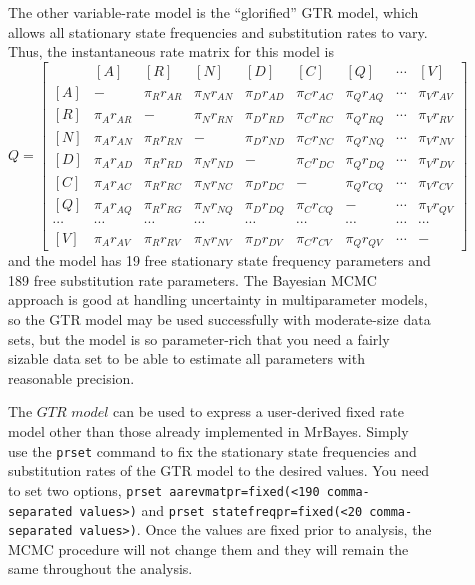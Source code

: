 \documentclass[12pt]{book}
\newcommand{\ttt}[1]{\texttt{#1}}
\begin{document}
\begin{figure}[h]
The other variable-rate model is the ``glorified'' GTR model, which allows all stationary state
frequencies and substitution rates to vary. Thus, the instantaneous rate matrix for this model is
\footnotesize
\[
Q=\begin{bmatrix}
    & [A] & [R] & [N] & [D] & [C] & [Q] & \cdots & [V]\\
 [A]& - & \pi_{R} r_{AR}& \pi_{N} r_{AN} & \pi_{D} r_{AD}& \pi_{C} r_{AC}& \pi_{Q} r_{AQ} & \cdots & \pi_V r_{AV}\\
 [R]& \pi_{A} r_{AR} &- &  \pi_{N}  r_{RN}& \pi_{D} r_{RD}& \pi_{C} r_{RC}& \pi_{Q} r_{RQ} & \cdots & \pi_V r_{RV}\\
 [N]& \pi_{A} r_{AN}&\pi_{R} r_{RN}&- &   \pi_{D} r_{ND}& \pi_{C} r_{NC}& \pi_{Q} r_{NQ} & \cdots & \pi_V r_{NV}\\
 [D]& \pi_{A} r_{AD} &\pi_{R} r_{RD} &  \pi_{N} r_{ND}&- &  \pi_{C} r_{DC}& \pi_{Q} r_{DQ} & \cdots & \pi_V r_{DV}\\
 [C]& \pi_{A} r_{AC} &\pi_{R} r_{RC} &  \pi_{N} r_{NC}&  \pi_{D} r_{DC}&- & \pi_{Q} r_{CQ} & \cdots & \pi_V r_{CV}\\
 [Q]& \pi_{A} r_{AQ} &\pi_{R} r_{RG} &  \pi_{N} r_{NQ}&  \pi_{D} r_{DQ}& \pi_{C} r_{CQ} &- & \cdots & \pi_V r_{QV}\\
 \cdots& \cdots& \cdots& \cdots& \cdots& \cdots& \cdots& \cdots& \cdots\\
 [V]& \pi_{A} r_{AV} &\pi_{R} r_{RV} &  \pi_{N} r_{NV}&  \pi_{D} r_{DV}& \pi_{C} r_{CV} &\pi_Q r_{QV}& \cdots & -
\end{bmatrix}
\]
\normalsize
and the model has 19 free stationary state frequency parameters and 189 free substitution rate
parameters. The Bayesian MCMC approach is good at handling uncertainty in multiparameter models, so
the GTR model may be used successfully with moderate-size data sets, but the model is so
parameter-rich that you need a fairly sizable data set to be able to estimate all parameters with
reasonable precision.

The $GTR$ $model$ can be used to express a user-derived fixed rate model other than those already
implemented in MrBayes. Simply use the \ttt{prset} command to fix the stationary state frequencies
and substitution rates of the GTR model to the desired values. You need to set two options,
\ttt{prset aarevmatpr=fixed(<190 comma-separated values>)} and \ttt{prset statefreqpr=fixed(<20
comma-separated values>)}. Once the values are fixed prior to analysis, the MCMC procedure will not
change them and they will remain the same throughout the analysis.


\end{figure}
\end{document}
